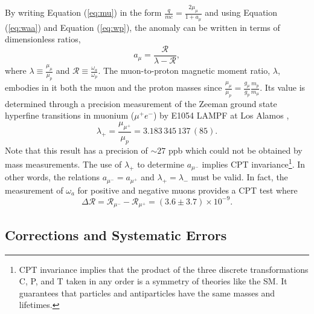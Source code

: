 \documentclass{outhesis}
\begin{document}
By writing Equation (\ref{eq:mu}) in the form $\displaystyle \frac{q}{mc} = \frac{2\mu_{\mu}}{1+a_{\mu}}$ and using Equation (\ref{eq:waa}) and Equation (\ref{eq:wp}), the anomaly can be written in terms of dimensionless ratios,
\begin{equation}
a_{\mu} = \frac{\mathcal{R}}{\lambda - \mathcal{R}},
\label{eq:R}
\end{equation}
where $\displaystyle \lambda \equiv \frac{\mu_{\mu}}{\mu_{p}}$ and $\displaystyle \mathcal{R} \equiv \frac{\omega_a}{\omega_p}$.
The muon-to-proton magnetic moment ratio, $\lambda$, embodies in it both the muon and the proton masses since $\displaystyle \frac{\mu_{\mu}}{\mu_{p}} = \frac{g_{\mu}}{g_p}\frac{m_p}{m_{\mu}}$. Its value is determined through a precision measurement of the Zeeman ground state hyperfine transitions in muonium ($\mu^+e^-$) by E1054 LAMPF at Los Alamos \cite{zeeman},
\[\lambda_+ = \frac{\mu_{\mu^+}}{\mu_{p}} = 3.183\, 345\, 137\, (85).\] %
Note that this result has a precision of $\sim 27$ ppb which could not be obtained by mass measurements. The use of $\lambda_+$ to determine $a_{\mu^-}$ implies CPT invariance\footnote{CPT invariance implies that the product of the three discrete transformations C, P, and T taken in any order is a symmetry of theories like the SM. It guarantees that particles and antiparticles have the same masses and lifetimes.}. In other words, the relations $a_{\mu^-} = a_{\mu^+}$ and $\lambda_+ = \lambda_-$ must be valid. In fact, the measurement of $\omega_a$ for positive and negative muons provides a CPT test where 
\begin{equation}
\Delta \mathcal{R} = \mathcal{R}_{\mu^-} - \mathcal{R}_{\mu^+} = \left(3.6 \pm 3.7 \right) \times 10^{-9}.
\end{equation}

\subsection{Corrections and Systematic Errors}
\end{document}
